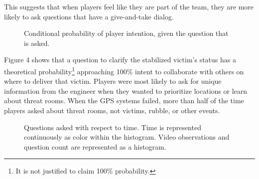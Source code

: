 This suggests that when players feel like they are part of the team, they are more likely to ask questions that have a give-and-take dialog.

\clearpage


\begin{figure}[h!]
    \centering
    \caption{ Conditional probability of player intention, given the question that is asked.}
\end{figure}



Figure 4 shows that a question to clarify the stabilized victim's status has a theoretical probability\footnote{It is not justified to claim 100\% probability.} approaching 100\% intent to collaborate with others on where to deliver that victim. Players were most likely to ask for unique information from the engineer when they wanted to prioritize locations or learn about threat rooms. When the GPS systems failed, more than half of the time players asked about threat rooms, not victims, rubble, or other events.





\clearpage
\begin{figure}[h!]
    \centering
    \caption{Questions asked with respect to time. Time is represented continuously as color within the histogram. Video observations and question count are represented as a histogram. }
    \end{figure}
    
